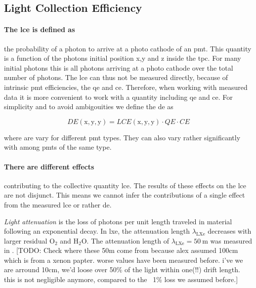 
\FloatBarrier
\subsection{Light Collection Efficiency}
\label{ssec:lce}
\FloatBarrier



\paragraph{The \gls{lce} is defined as} the probability of a photon to arrive at a photo cathode of an \gls{pmt}.
This quantity is a function of the photons initial position x,y and z inside the \gls{tpc}.
For many initial photons this is all photons arriving at a photo cathode over the total number of photons.
The \gls{lce} can thus not be measured directly, because of intrinsic \gls{pmt} efficiencies, the \gls{qe} and \gls{ce}.
Therefore, when working with measured data it is more convenient to work with a quantity including \gls{qe} and \gls{ce}.
For simplicity and to avoid ambigouities we define the \gls{de} as


\begin{equation}
    DE\left(\mathrm{x}, \mathrm{y}, \mathrm{y}\right) =  LCE\left(\mathrm{x}, \mathrm{y}, \mathrm{y}\right) \cdot QE \cdot CE
\end{equation}

where are vary for different \gls{pmt} types.
They can also vary rather significantly with among \gls{pmt}s of the same type.

\paragraph{There are different effects} contributing to the collective quantity \gls{lce}.
The results of these effects on the \gls{lce} are not disjunct.
This means we cannot infer the contributions of a single effect from the measured \gls{lce} or rather \gls{de}.

\emph{Light attenuation} is the loss of photons per unit length traveled in material following an exponential decay.
In \gls{lxe}, the attenuation length $ \lambda_\mathrm{LXe} $ decreases with larger residual $ \mathrm{O}_2 $ and $ \mathrm{H}_2\mathrm{O} $.
The attenuation length of $ \lambda_\mathrm{LXe} = \SI{50}{\m} $ was measured in \oneton\cite{}.  %
[TODO: Check where these 50m come from because alex assumed 100cm which is from a xenon papter. worse values have been measured before. i've we are arround 10cm, we'd loose over 50\% of the light within one(!!) drift length. this is not negligible anymore, compared to the ~1\% loss we assumed before.]


